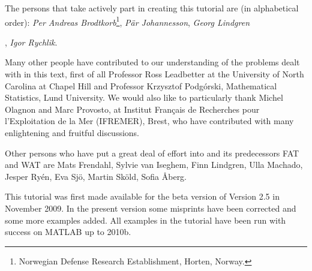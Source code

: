 The persons that take actively part in creating this tutorial are (in alphabetical order):
{\sl Per Andreas Brodtkorb}\footnote{Norwegian Defense Research Establishment, Horten, Norway.},
{\sl  P\"ar Johannesson}\footnotemark[2], %
{\sl  Georg Lindgren}\footnotemark[3] \addtocounter{footnote}{-2},
{\sl  Igor Rychlik}\footnotemark[4]. \addtocounter{footnote}{1}
Many other people have contributed to our understanding of the problems
dealt with in this text, first of all Professor Ross Leadbetter at
the University of North Carolina at Chapel Hill and
Professor Krzysztof Podg\'orski, Mathematical Statistics, Lund University.
We would also like to particularly thank
Michel Olagnon and Marc Provosto,
at Institut Fran\c{c}ais de Recherches pour l'Exploitation de la Mer (IFREMER),
Brest, who have contributed with many enlightening and fruitful discussions.

Other persons who have put a great deal of effort into \wf{} and
its predecessors FAT and WAT are Mats Frendahl, Sylvie van Iseghem, Finn Lindgren,
Ulla Machado, Jesper Ry\'en, Eva Sj{\" o}, Martin Sk{\" o}ld, Sofia {\AA}berg.

This tutorial was first made available for the beta version of
\wf{} Version 2.5 in November 2009. In the present version some misprints
have been corrected and some more examples added.
All examples in the tutorial have been run with success
on MATLAB up to 2010b.

\cleardoublepage
